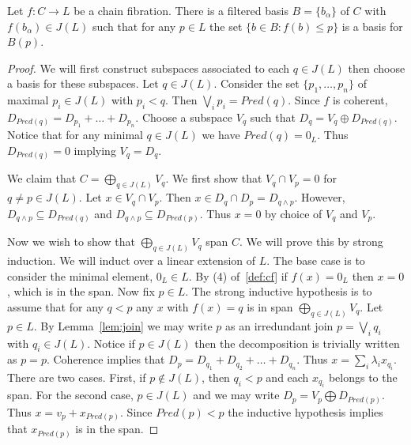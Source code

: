 \begin{thm} \label{thm:cfdecomp:basis}
Let $f:C\to L$ be a chain fibration.  There is a filtered basis $B=\{b_\alpha\}$ of $C$ with $f(b_\alpha)\in J(L)$ such that for any $p\in L$ the set $\{b\in B: f(b)\leq p\}$ is a basis for $B(p)$.  

\end{thm}
\begin{proof}


 We will first construct subspaces associated to each $q\in J(L)$ then choose a basis for these subspaces.  Let $q\in J(L)$.  Consider the set $\{p_1,\ldots,p_n\}$ of maximal $p_i\in J(L)$ with $p_i < q$.  Then $\bigvee_i p_i = Pred(q)$.   Since $f$ is coherent, $D_{Pred(q)} = D_{p_1}+\ldots + D_{p_n}$.  Choose a subspace $V_q$ such that $D_q = V_q \oplus D_{Pred(q)}$.  Notice that for any minimal $q\in J(L)$ we have $Pred(q)=0_L$.  Thus $D_{Pred(q)}=0$ implying $V_q = D_q$.

We claim that $C = \bigoplus_{q\in J(L)} V_q$.  We first show that $V_q\cap V_p=0$ for $q\neq p\in J(L)$.  Let $x\in V_q\cap V_p$.  Then $x\in D_q\cap D_p = D_{q\wedge p}$.  However, $D_{q\wedge p}\subseteq D_{Pred(q)}$ and $D_{q\wedge p}\subseteq D_{Pred(p)}$.  Thus $x=0$ by choice of $V_q$ and $V_p$.  

Now we wish to show that $\bigoplus_{q\in J(L)} V_q$ span $C$.  We will prove this by strong induction.  We will induct over a linear extension of $L$.  The base case is to consider the minimal element, $0_L\in L$.  By (4) of~\ref{def:cf} if $f(x)=0_L$ then $x=0$, which is in the span.   Now fix $p\in L$.  The strong inductive hypothesis is to assume that for any $q< p$ any $x$ with $f(x)=q$ is in span $\bigoplus_{q\in J(L)} V_q$.  Let $p\in L$.  By Lemma~\ref{lem:join} we may write $p$ as an irredundant join $p=\bigvee_i q_i$ with $q_i \in J(L)$. Notice if $p\in J(L)$ then the decomposition is trivially written as $p=p$.  Coherence implies that $D_p = D_{q_1}+D_{q_2}+\ldots+D_{q_n}$.  Thus $x= \sum_i \lambda_i x_{q_i}$.  There are two cases.  First, if $p\not\in J(L)$, then $q_i< p$ and each $x_{q_i}$ belongs to the span.  For the second case, $p\in J(L)$ and we may write $D_p = V_p \bigoplus D_{Pred(p)}$.  Thus $x = v_p + x_{Pred(p)}$.  Since $Pred(p)<p$ the inductive hypothesis implies that $x_{Pred(p)}$ is in the span. 



\end{proof}
